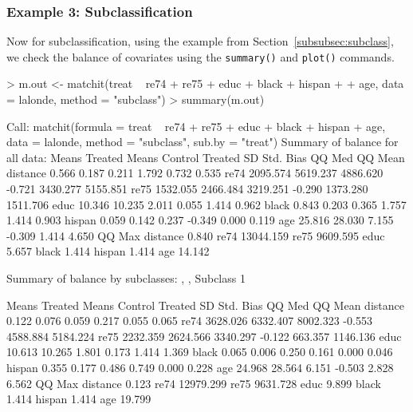 \documentclass[oneside,letterpaper,titlepage]{article}
\begin{document}
\subsubsection{Example 3: Subclassification}
\label{subsubsec:balancesubclass}
Now for subclassification, using the example from
  Section~\ref{subsubsec:subclass}, we check the balance of covariates
  using the \texttt{summary()} and \texttt{plot()} commands.
\begin{Schunk}
\begin{Sinput}
> m.out <- matchit(treat ~ re74 + re75 + educ + black + hispan + 
+     age, data = lalonde, method = "subclass")
> summary(m.out)
\end{Sinput}
\begin{Soutput}
Call:
matchit(formula = treat ~ re74 + re75 + educ + black + hispan + 
    age, data = lalonde, method = "subclass", sub.by = "treat")
Summary of balance for all data:
         Means Treated Means Control Treated SD Std. Bias   QQ Med  QQ Mean
distance         0.566         0.187      0.211     1.792    0.732    0.535
re74          2095.574      5619.237   4886.620    -0.721 3430.277 5155.851
re75          1532.055      2466.484   3219.251    -0.290 1373.280 1511.706
educ            10.346        10.235      2.011     0.055    1.414    0.962
black            0.843         0.203      0.365     1.757    1.414    0.903
hispan           0.059         0.142      0.237    -0.349    0.000    0.119
age             25.816        28.030      7.155    -0.309    1.414    4.650
            QQ Max
distance     0.840
re74     13044.159
re75      9609.595
educ         5.657
black        1.414
hispan       1.414
age         14.142


Summary of balance by subclasses:
, , Subclass 1

         Means Treated Means Control Treated SD Std. Bias    QQ Med   QQ Mean
distance         0.122         0.076      0.059     0.217     0.055     0.065
re74          3628.026      6332.407   8002.323    -0.553  4588.884  5184.224
re75          2232.359      2624.566   3340.297    -0.122   663.357  1146.136
educ            10.613        10.265      1.801     0.173     1.414     1.369
black            0.065         0.006      0.250     0.161     0.000     0.046
hispan           0.355         0.177      0.486     0.749     0.000     0.228
age             24.968        28.564      6.151    -0.503     2.828     6.562
            QQ Max
distance     0.123
re74     12979.299
re75      9631.728
educ         9.899
black        1.414
hispan       1.414
age         19.799


\end{Soutput}
\end{Schunk}
\end{document}
